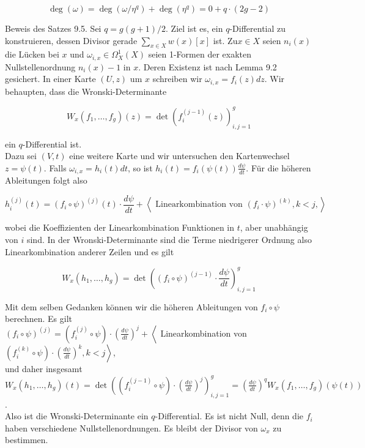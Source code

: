 \documentclass[10pt, letterpaper]{article}
\begin{document}
$$
\operatorname{deg}(\omega)=\operatorname{deg}\left(\omega / \eta^{q}\right)+\operatorname{deg}\left(\eta^{q}\right)=0+q \cdot(2 g-2)
$$

Beweis des Satzes 9.5. Sei $q=g(g+1) / 2$. Ziel ist es, ein $q$-Differential zu konstruieren, dessen Divisor gerade $\sum_{x \in X} w(x)[x]$ ist. $\mathrm{Zu} x \in X$ seien $n_{i}(x)$ die Lücken bei $x$ und $\omega_{i, x} \in \Omega_{X}^{1}(X)$ seien 1-Formen der exakten Nullstellenordnung $n_{i}(x)-1$ in $x$. Deren Existenz ist nach Lemma 9.2 gesichert. In einer Karte $(U, z)$ um $x$ schreiben wir $\omega_{i, x}=f_{i}(z) d z$. Wir behaupten, dass die Wronski-Determinante

$$
W_{x}\left(f_{1}, \ldots, f_{g}\right)(z)=\operatorname{det}\left(f_{i}^{(j-1)}(z)\right)_{i, j=1}^{g}
$$

ein $q$-Differential ist.\\
Dazu sei $(V, t)$ eine weitere Karte und wir untersuchen den Kartenwechsel $z=\psi(t)$. Falls $\omega_{i, x}=h_{i}(t) d t$, so ist $h_{i}(t)=f_{i}(\psi(t)) \frac{d \psi}{d t}$. Für die höheren Ableitungen folgt also

$$
h_{i}^{(j)}(t)=\left(f_{i} \circ \psi\right)^{(j)}(t) \cdot \frac{d \psi}{d t}+\left\langle\text { Linearkombination von }\left(f_{i} \cdot \psi\right)^{(k)}, k<j,\right\rangle
$$

wobei die Koeffizienten der Linearkombination Funktionen in $t$, aber unabhängig von $i$ sind. In der Wronski-Determinante sind die Terme niedrigerer Ordnung also Linearkombination anderer Zeilen und es gilt

$$
W_{x}\left(h_{1}, \ldots, h_{g}\right)=\operatorname{det}\left(\left(f_{i} \circ \psi\right)^{(j-1)} \cdot \frac{d \psi}{d t}\right)_{i, j=1}^{g}
$$

Mit dem selben Gedanken können wir die höheren Ableitungen von $f_{i} \circ \psi$ berechnen. Es gilt\\
$\left(f_{i} \circ \psi\right)^{(j)}=\left(f_{i}^{(j)} \circ \psi\right) \cdot\left(\frac{d \psi}{d t}\right)^{j}+\left\langle\right.$ Linearkombination von $\left.\left(f_{i}^{(k)} \circ \psi\right) \cdot\left(\frac{d \psi}{d t}\right)^{k}, k<j\right\rangle$,\\
und daher insgesamt\\
$W_{x}\left(h_{1}, \ldots, h_{g}\right)(t)=\operatorname{det}\left(\left(f_{i}^{(j-1)} \circ \psi\right) \cdot\left(\frac{d \psi}{d t}\right)^{j}\right)_{i, j=1}^{g}=\left(\frac{d \psi}{d t}\right)^{q} W_{x}\left(f_{1}, \ldots, f_{g}\right)(\psi(t))$.\\
Also ist die Wronski-Determinante ein $q$-Differential. Es ist nicht Null, denn die $f_{i}$ haben verschiedene Nullstellenordnungen. Es bleibt der Divisor von $\omega_{x}$ zu bestimmen.
\end{document}
